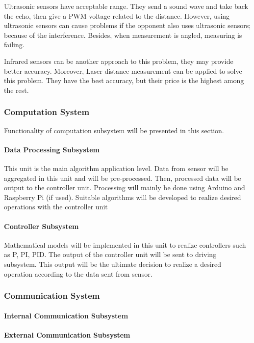 \documentclass[a4paper,12pt]{article}
\begin{document}
Ultrasonic sensors have acceptable range. They send a sound wave and take back the echo, then give a PWM voltage related to the distance. However, using ultrasonic sensors can cause problems if the opponent also uses ultrasonic sensors; because of the interference. Besides, when measurement is angled, measuring is failing. 

Infrared sensors can be another approach to this problem, they may provide better accuracy. Moreover, Laser distance measurement can be applied to solve this problem. They have the best accuracy, but their price is the highest among the rest.

	\subsubsection{Computation System}
		Functionality of computation subsystem will be presented in this section.
	
		\paragraph{Data Processing Subsystem}
		This unit is the main algorithm application level. Data from sensor will be aggregated in this unit and will be pre-processed. Then, processed data will be output to the controller unit. Processing will mainly be done using Arduino and Raspberry Pi (if used). Suitable algorithms will be developed to realize desired operations with the controller unit

		\paragraph{Controller Subsystem}
			Mathematical models will be implemented in this unit to realize controllers such as P, PI, PID. The output of the controller unit will be sent to driving subsystem. This output will be the ultimate decision to realize a desired operation according to the data sent from sensor.


	\subsubsection{Communication System}
	
		\paragraph{Internal Communication Subsystem}
		
		\paragraph{External Communication Subsystem}
		
\end{document}
